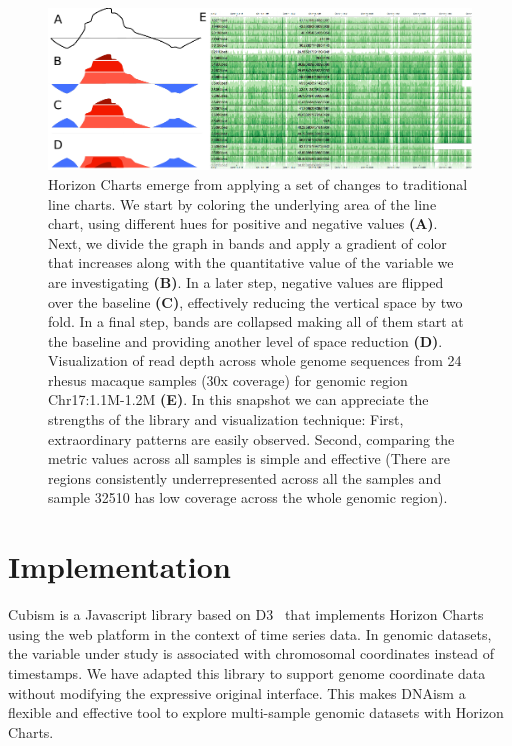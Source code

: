 \documentclass{bioinfo}
\begin{document}
\begin{figure}
\centerline{\includegraphics{figure.pdf}}
\caption{
Horizon Charts emerge from applying a set of changes to
traditional line charts. We start by coloring the underlying area of the line
chart, using different hues for positive and negative values \textbf{(A)}. Next, we
divide the graph in bands and apply a gradient of color that increases along
with the quantitative value of the variable we are investigating \textbf{(B)}. In a later
step, negative values are flipped over the baseline \textbf{(C)}, effectively
reducing the vertical space by two fold. In a final step, bands are collapsed
making all of them start at the baseline and providing another level of space
reduction \textbf{(D)}.  Visualization of read depth across whole genome sequences from
24 rhesus macaque samples (30x coverage) for genomic region Chr17:1.1M-1.2M
\textbf{(E)}. In this snapshot we can appreciate the strengths of the library and
visualization technique: First, extraordinary patterns are easily observed.
Second, comparing the metric values across all samples is simple and
effective (There are regions consistently underrepresented across all the
samples and sample 32510 has low coverage across the whole genomic region).
}\label{fig:01}
\end{figure}



\section{Implementation}

Cubism is a Javascript library based on D3~\citep{2011-d3} that implements
Horizon Charts using the web platform in the context of time series data. In
genomic datasets, the variable under study is associated with chromosomal
coordinates instead of timestamps. We have adapted this library to support
genome coordinate data without modifying the expressive original interface.
This makes DNAism a flexible and effective tool to explore multi-sample genomic
datasets with Horizon Charts.
\end{document}
